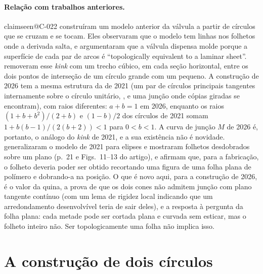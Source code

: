 \documentclass[11pt,a4paper]{article}
\makeatletter
\theoremstyle{plain}
\theoremstyle{remark}
\newcommand{\claim}[1]{\ifcsname claimseen@#1\endcsname\else\expandafter\gdef\csname claimseen@#1\endcsname{}\label{claim:#1}\fi}
\makeatother
\begin{document}
\paragraph{Relação com trabalhos anteriores.}\claim{C-022} \citet{McKee2021} construíram um modelo anterior da válvula a
partir de círculos que se cruzam e se tocam. Eles observaram que o modelo tem linhas nos folhetos onde a derivada salta, e
argumentaram que a válvula dispensa molde porque a superfície de cada par de arcos é ``topologically equivalent to a laminar
sheet''. \citet{Rebolledo2023} removeram esse \emph{kink} com um trecho cúbico, em cada seção horizontal, entre os dois pontos
de interseção de um círculo grande com um pequeno. A construção de 2026 tem a mesma estrutura da de 2021 (um par de círculos
principais tangentes internamente sobre o círculo unitário, \citealp[eqs.~(5)--(6)]{McKee2021}, e uma junção onde cópias
giradas se encontram), com raios diferentes: $a+b=1$ em 2026, enquanto os raios $(1+b+b^2)/(2+b)$ e $(1-b)/2$ dos círculos de
2021 \citep[eqs.~(3.2)--(3.3)]{Rebolledo2023} somam $1+b(b-1)/(2(b+2))<1$ para $0<b<1$. A curva de junção $M$ de 2026 é,
portanto, o análogo do \emph{kink} de 2021, e a sua existência não é novidade. \citet{Oliveira2022} generalizaram o modelo de
2021 para elipses e mostraram folhetos desdobrados sobre um plano (p.~21 e Figs.~11--13 do artigo), e \citet{Oliveira2024}
afirmam que, para a fabricação, o folheto deveria poder ser obtido recortando uma figura de uma folha plana de polímero e
dobrando-a na posição. O que é novo aqui, para a construção de 2026, é o valor da quina, a prova de que os dois cones não
admitem junção com plano tangente contínuo (com um lema de rigidez local indicando que um arredondamento desenvolvível teria
de sair deles), e a resposta à pergunta da folha plana: cada metade pode ser cortada plana e curvada sem esticar, mas o
folheto inteiro não. Ser topologicamente uma folha não implica isso.

\section{A construção de dois círculos}\label{sec:construction}
\end{document}
